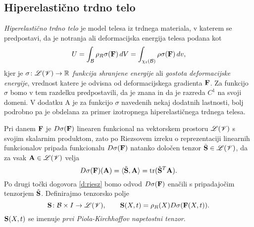 \subsection{Hiperelastično trdno telo}


\emph{Hiperelastično trdno telo} je model telesa iz trdnega materiala, v katerem se predpostavi,
da je notranja ali deformacijska energija telesa podana kot
\[ U=\int_{\mathcal B}\rho_R \sigma(\mathbf F)\,dV=\int_{\chi_t(\mathcal B)}\rho\sigma(\mathbf F)\,dv, \]
kjer je $\sigma\colon\mathscr L(\mathscr V)\to\mathbb R$ \emph{funkcija shranjene energije} ali \emph{gostota deformacijske energije},
vrednost katere je odvisna od
deformacijskega gradienta $\mathbf F$. Za funkcijo $\sigma$ bomo v tem razdelku predpostavili, da je znana in da je
razreda $C^1$ na svoji domeni. V dodatku A je za funkcijo $\sigma$ navedenih nekaj dodatnih lastnosti,
bolj podrobno pa je obdelana za primer izotropnega hiperelastičnega trdnega telesa.

Pri danem $\mathbf F$ je $D\sigma(\mathbf F)$ linearen funkcional
na vektorskem prostoru $\mathscr L(\mathscr V)$ s svojim skalarnim produktom, zato po Riezsovem izreku
o reprezentaciji linearnih funkcionalov pripada funkcionalu $D\sigma(\mathbf F)$ natanko
določen tenzor $\tilde{\mathbf S}\in\mathscr L(\mathscr V)$, da za vsak $\mathbf A\in\mathscr L(\mathscr V)$ velja
\[ D\sigma(\mathbf F)(\mathbf A)=\langle\tilde{\mathbf S},\mathbf A\rangle=\mathrm{tr}(\tilde{\mathbf S}^{T}\mathbf A). \]
Po drugi točki dogovora \ref{d:riesz}
bomo odvod $D\sigma(\mathbf F)$ enačili s pripadajočim tenzorjem $\tilde{\mathbf S}$.
Definirajmo tenzorsko polje
\begin{equation} \label{e:piola}
	\ten{S}\colon \B\times I\to\L(\V),\qquad
	\ten{S}(X,t)=\rho_R(X)D\sigma(\ten{F}(X,t)).%
\end{equation}
$\mathbf S(X,t)$ se imenuje \emph{prvi Piola-Kirchhoffov napetostni tenzor}.

